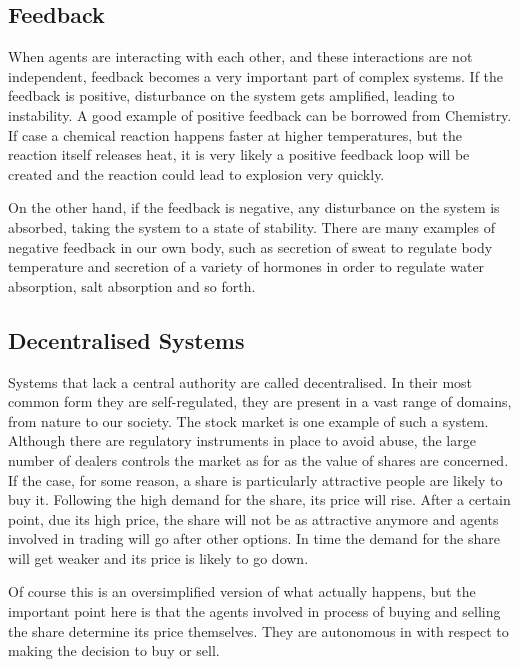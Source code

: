 \subsection{Feedback}
\label{subsec:feedback}

When agents are interacting with each other, and these interactions are not independent, feedback becomes a very important part of complex systems. If the feedback is positive, disturbance on the system gets amplified, leading to instability. A good example of positive feedback can be borrowed from Chemistry. If case a chemical reaction happens faster at higher temperatures, but the reaction itself releases heat, it is very likely a positive feedback loop will be created and the reaction could lead to explosion very quickly.

On the other hand, if the feedback is negative, any disturbance on the system is absorbed, taking the system to a state of stability. There are many examples of negative feedback in our own body, such as secretion of sweat to regulate body temperature and secretion of a variety of hormones in order to regulate water absorption, salt absorption and so forth.  

\subsection{Decentralised Systems}

Systems that lack a central authority are called decentralised. In their most common form they are self-regulated, they are present in a vast range of domains, from nature to our society. The stock market is one example of such a system. Although there are regulatory instruments in place to avoid abuse, the large number of dealers controls the market as for as the value of shares are concerned. If the case, for some reason, a share is particularly attractive people are likely to buy it. Following the high demand for the share, its price will rise. After a certain point, due its high price, the share will not be as attractive anymore and agents involved in trading will go after other options. In  time the demand for the share will get weaker and its price is likely to go down.

Of course this is an oversimplified version of what actually happens, but the important point here is that the agents involved in process of buying and selling the share determine its price themselves. They are autonomous in with respect to making the decision to buy or sell.

